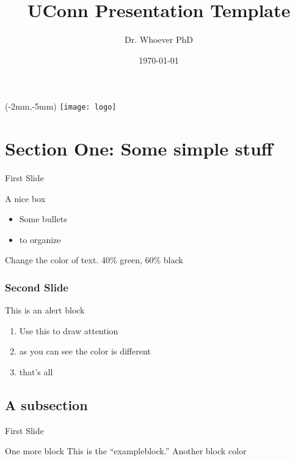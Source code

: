 \documentclass{beamer}
\title{UConn Presentation Template}
\author{Dr. Whoever PhD}
\institute{University of Connecticut}
\date{\today}
\begin{document}
\begin{frame}
\begin{textblock*}{80mm}(-2mm,-5mm)
\texttt{[image: logo]}
\end{textblock*}
\titlepage

\end{frame}

\begin{frame}
\tableofcontents
\end{frame}

\section{Section One: Some simple stuff}
\begin{frame}{First Slide}

\begin{block}{A nice box}
\begin{itemize}
\item Some bullets
\item to organize
\end{itemize}
\end{block}

{\color{green!40!black} Change the color of text. 40\% green, 60\% black}
\end{frame}

\begin{frame}
\frametitle{Second Slide}
\begin{alertblock}{This is an alert block}
\begin{enumerate}
\item Use this to draw attention
\item as you can see the color is different
\item that's all
\end{enumerate}
\end{alertblock}

\end{frame}

\subsection{A subsection}
\begin{frame}{First Slide}
\begin{exampleblock}{One more block}
This is the ``exampleblock.'' Another block color
\end{exampleblock}
\end{frame}
\end{document}
